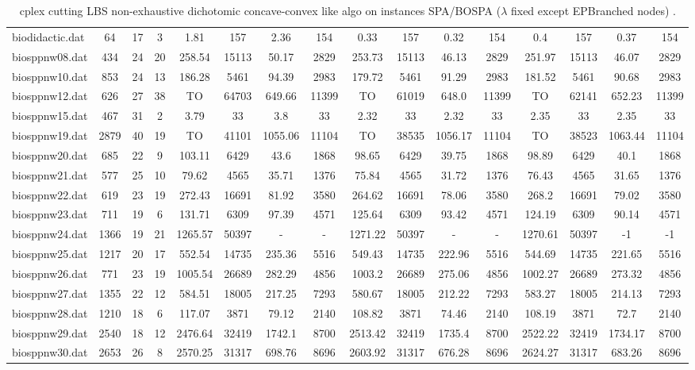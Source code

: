 \begin{sidewaystable}[!ht]
{\begin{tabular}{lccccccccccccccc}
biodidactic.dat & 64 & 17 & 3 & 1.81 & 157 & 2.36 & 154 & 0.33 & 157 &  \textcolor{blue2}{0.32} & 154 & 0.4 & 157 & 0.37 & 154 \\
biosppnw08.dat & 434 & 24 & 20 & 258.54 & 15113 & 50.17 & 2829 & 253.73 & 15113 & 46.13 & 2829 & 251.97 & 15113 & 46.07 & 2829 \\
biosppnw10.dat & 853 & 24 & 13 & 186.28 & 5461 & 94.39 & 2983 & 179.72 & 5461 & 91.29 & 2983 & 181.52 & 5461 & 90.68 & 2983 \\
biosppnw12.dat & 626 & 27 & 38 &  TO & 64703 & 649.66 & 11399 &  TO & 61019 & 648.0 & 11399 &  TO & 62141 & 652.23 & 11399 \\
biosppnw15.dat & 467 & 31 & 2 & 3.79 & 33 & 3.8 & 33 &  \textcolor{blue2}{2.32} & 33 &  \textcolor{blue2}{2.32} & 33 & 2.35 & 33 & 2.35 & 33 \\
biosppnw19.dat & 2879 & 40 & 19 &  TO & 41101 &  \textcolor{blue2}{1055.06} & 11104 &  TO & 38535 & 1056.17 & 11104 &  TO & 38523 & 1063.44 & 11104 \\
biosppnw20.dat & 685 & 22 & 9 & 103.11 & 6429 & 43.6 & 1868 & 98.65 & 6429 &  \textcolor{blue2}{39.75} & 1868 & 98.89 & 6429 & 40.1 & 1868 \\
biosppnw21.dat & 577 & 25 & 10 & 79.62 & 4565 & 35.71 & 1376 & 75.84 & 4565 & 31.72 & 1376 & 76.43 & 4565 & 31.65 & 1376 \\
biosppnw22.dat & 619 & 23 & 19 & 272.43 & 16691 & 81.92 & 3580 & 264.62 & 16691 &  \textcolor{blue2}{78.06} & 3580 & 268.2 & 16691 & 79.02 & 3580 \\
biosppnw23.dat & 711 & 19 & 6 & 131.71 & 6309 & 97.39 & 4571 & 125.64 & 6309 & 93.42 & 4571 & 124.19 & 6309 & 90.14 & 4571 \\
biosppnw24.dat & 1366 & 19 & 21 &  \textcolor{blue2}{1265.57} & 50397 &  - &  - & 1271.22 & 50397 &  - &  - & 1270.61 & 50397 & -1 & -1 \\
biosppnw25.dat & 1217 & 20 & 17 & 552.54 & 14735 & 235.36 & 5516 & 549.43 & 14735 & 222.96 & 5516 & 544.69 & 14735 & 221.65 & 5516 \\
biosppnw26.dat & 771 & 23 & 19 & 1005.54 & 26689 & 282.29 & 4856 & 1003.2 & 26689 & 275.06 & 4856 & 1002.27 & 26689 & 273.32 & 4856 \\
biosppnw27.dat & 1355 & 22 & 12 & 584.51 & 18005 & 217.25 & 7293 & 580.67 & 18005 & 212.22 & 7293 & 583.27 & 18005 & 214.13 & 7293 \\
biosppnw28.dat & 1210 & 18 & 6 & 117.07 & 3871 & 79.12 & 2140 & 108.82 & 3871 & 74.46 & 2140 & 108.19 & 3871 & 72.7 & 2140 \\
biosppnw29.dat & 2540 & 18 & 12 & 2476.64 & 32419 & 1742.1 & 8700 & 2513.42 & 32419 & 1735.4 & 8700 & 2522.22 & 32419 & 1734.17 & 8700 \\
biosppnw30.dat & 2653 & 26 & 8 & 2570.25 & 31317 & 698.76 & 8696 & 2603.92 & 31317 &  \textcolor{blue2}{676.28} & 8696 & 2624.27 & 31317 & 683.26 & 8696 \\
\bottomrule
\end{tabular}
}%
\caption{cplex cutting LBS non-exhaustive dichotomic concave-convex like algo on instances SPA/BOSPA ($\lambda$ fixed except EPBranched nodes) .}
\end{sidewaystable}
